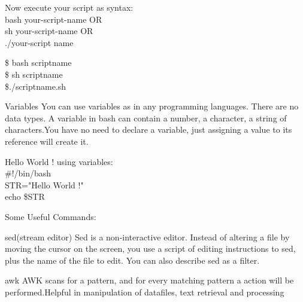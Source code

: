 \documentclass[pdf]{beamer}
\begin{document}
\begin{frame}
\begin{block}{}
Now execute your script as syntax: \\
bash your-script-name OR \\
sh your-script-name OR \\
./your-script name
\end{block}

\begin{example}
\$ bash scriptname \\
\$ sh scriptname \\
\$./scriptname.sh
\end{example}

\end{frame}

\begin{frame}
\begin{block}{Variables}
You can use variables as in any programming languages. There are no data types. A variable
in bash can contain a number, a character, a string of characters.You have no need to declare a variable, just assigning a value to its reference will create it.
\end{block}

\begin{example}
Hello World ! using variables: \\
\#!/bin/bash \\
STR="Hello World !" \\
echo \$STR
\end{example}

\end{frame}

\begin{frame}
Some Useful Commands:

\begin{block}{sed(stream editor)}
Sed is a non-interactive editor. Instead of altering a file by moving the
cursor on the screen, you use a script of editing instructions to sed, plus the name of the file to edit. You can also describe sed as a filter.
\end{block}

\begin{block}{awk}
AWK scans for a pattern, and for every matching pattern a action will
be performed.Helpful in manipulation of datafiles, text retrieval and processing
\end{block}

\end{frame}
\end{document}
